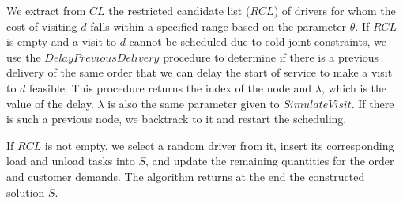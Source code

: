 \documentclass{article}
\begin{document}
We extract from $CL$ the restricted candidate list ($RCL$) of drivers for whom the cost of visiting $d$ falls within a specified range based on the parameter $\theta$. If $RCL$ is empty and a visit to $d$ cannot be scheduled due to cold-joint constraints, we use the $DelayPreviousDelivery$ procedure to determine if there is a previous delivery of the same order that we can delay the start of service to make a visit to $d$ feasible. This procedure returns the index of the node and $\lambda$, which is the value of the delay. $\lambda$ is also the same parameter given to $SimulateVisit$. If there is such a previous node, we backtrack to it and restart the scheduling.

If $RCL$ is not empty, we select a random driver from it, insert its corresponding load and unload tasks into $S$, and update the remaining quantities for the order and customer demands. The algorithm returns at the end the constructed solution $S$.
\end{document}
